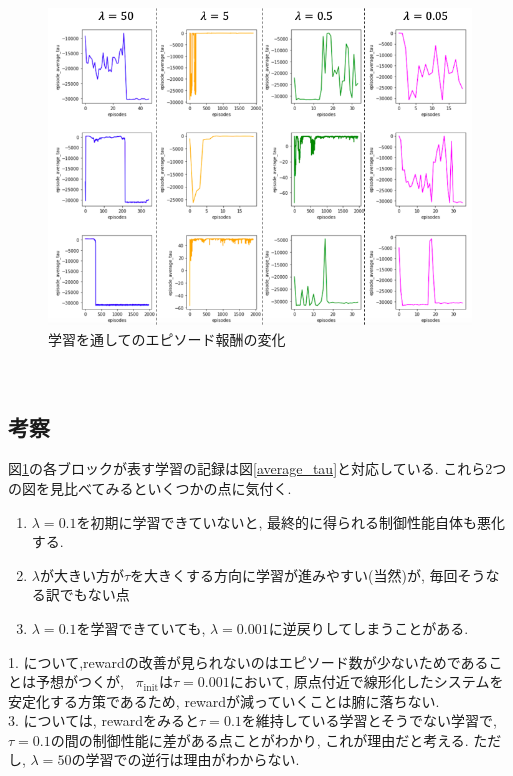 \documentclass{jsarticle}
\begin{document}
\begin{figure}[h]
	\centering
 	\includegraphics[width=14cm]{reward_log.png}
 	\caption{学習を通してのエピソード報酬の変化} \label{reward_log}
\end{figure}\\

\subsection{考察}
図\ref{reward_log}の各ブロックが表す学習の記録は図\ref{average_tau}と対応している. これら2つの図を見比べてみるといくつかの点に気付く.
\begin{enumerate}
  \item $\lambda=0.1$を初期に学習できていないと, 最終的に得られる制御性能自体も悪化する.
  \item $\lambda$が大きい方が$\tau$を大きくする方向に学習が進みやすい(当然)が, 毎回そうなる訳でもない点
  \item $\lambda=0.1$を学習できていても, $\lambda=0.001$に逆戻りしてしまうことがある. 
\end{enumerate}
1. について,rewardの改善が見られないのはエピソード数が少ないためであることは予想がつくが, ~$\pi_{\textrm{init}}$は$\tau=0.001$において, 原点付近で線形化したシステムを安定化する方策であるため, rewardが減っていくことは腑に落ちない.\\
3. については, rewardをみると$\tau=0.1$を維持している学習とそうでない学習で, $\tau=0.1$の間の制御性能に差がある点ことがわかり, これが理由だと考える. ただし, $\lambda=50$の学習での逆行は理由がわからない.\par
\end{document}
